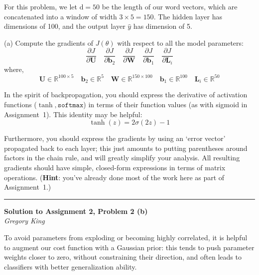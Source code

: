 \documentclass[letter,12pt]{article}
\newcommand{\myhwtitle}[3]
{\begin{center}
{\large {\bf Solution to Assignment {#1}, Problem {#2}}}\\
\medskip 
{\it {#3}} %
\end{center}}
\begin{document}
\noindent For this problem, we let $\textrm{d} = 50$ be the length of our word vectors, which are concatenated into a window of width $3\times5=150$. The hidden layer has dimensions of 100, and the output layer $\hat{y}$ has dimension of 5.

\noindent (a) Compute the gradients of $J(\theta)$ with respect to all the model parameters:\\
\begin{equation}
\frac{\partial J}{\partial{\boldsymbol U}}\quad\frac{\partial J}{\partial{\boldsymbol b}_{2}}\quad\frac{\partial J}{\partial{\boldsymbol W}}\quad\frac{\partial J}{\partial{\boldsymbol b}_{1}}\quad\frac{\partial J}{\partial{\boldsymbol L}_{i}}
\end{equation}
where,\\
\begin{equation}
{\boldsymbol U}\in\mathbb{R}^{100\times5}\quad{\boldsymbol b}_{2}\in\mathbb{R}^{5}\quad{\boldsymbol W}\in\mathbb{R}^{150\times100}\quad{\boldsymbol b}_{1}\in\mathbb{R}^{100}\quad{\boldsymbol L}_{i}\in\mathbb{R}^{50}
\end{equation}

\noindent In the spirit of backpropagation, you should express the derivative of activation functions ($\tanh,\texttt{softmax}$) in terms of their function values (as with sigmoid in Assignment~1). This identity may be helpful:\\
\begin{equation}
\tanh(z) = 2\sigma(2z)-1
\end{equation}

\noindent Furthermore, you should express the gradients by using an `error vector' propagated back to each layer; this just amounts to putting parentheses around factors in the chain rule, and will greatly simplify your analysis. All resulting gradients should have simple, closed-form expressions in terms of matrix operations. (\textbf{Hint}: you've already done most of the work here as part of Assignment~1.)

\vspace{5mm}
\noindent\rule{\textwidth}{0.4pt}

\clearpage

\myhwtitle{2}{2 (b)}{Gregory King}

\bigskip

\noindent To avoid parameters from exploding or becoming highly correlated, it is helpful to augment our cost function with a Gaussian prior: this tends to push parameter weights closer to zero, without constraining their direction, and often leads to classifiers with better generalization ability.\\
\end{document}
